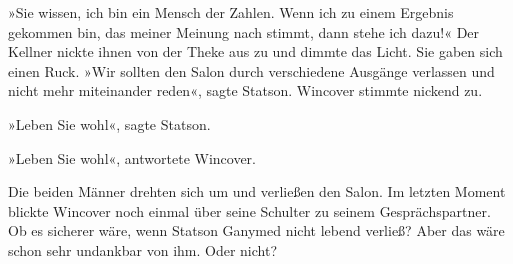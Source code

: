 »Sie wissen, ich bin ein Mensch der Zahlen. Wenn ich zu einem
Ergebnis gekommen bin, das meiner Meinung nach stimmt, dann stehe
ich dazu!« Der Kellner nickte ihnen von der Theke aus zu und dimmte
das Licht. Sie gaben sich einen Ruck. »Wir sollten den Salon durch
verschiedene Ausgänge verlassen und nicht mehr miteinander reden«,
sagte Statson. Wincover stimmte nickend zu.

»Leben Sie wohl«, sagte Statson.

»Leben Sie wohl«, antwortete Wincover.

\bigpar

Die beiden Männer drehten sich um und verließen den Salon. Im
letzten Moment blickte Wincover noch einmal über seine Schulter zu
seinem Gesprächspartner. Ob es sicherer wäre, wenn Statson Ganymed
nicht lebend verließ? Aber das wäre schon sehr undankbar von ihm.
Oder nicht?



